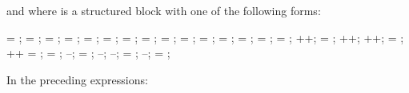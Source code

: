 \begin{ccppspecific}
\begin{itemize}
and where  is a structured block with one of the following forms:

\begin{ompSyntax}
{  = ;  = ; }
{  = ;  = ; }
{  = ;  =   ; }
{  = ;  =   ; }
{  =   ;  = ; }
{  =   ;  = ; }
{  = ;  = ; }
{  = ; ++; }
{  = ; ++; }
{ ++;  = ; }
{ ++\code{;}  = ; }
{  = ; --; }
{  = ; --; }
{ --;  = ; }
{ --;  = ; }
\end{ompSyntax}
\end{itemize}

In the preceding expressions:


\end{ccppspecific}
